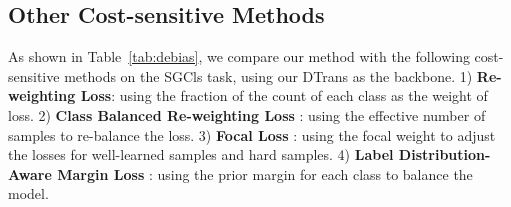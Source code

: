 \subsection{Other Cost-sensitive Methods}
As shown in Table~\ref{tab:debias}, we compare our method with the following cost-sensitive methods on the SGCls task, using our DTrans as the backbone. 
1) \textbf{Re-weighting Loss}: using the fraction of the count of each class as the weight of loss. 
2) \textbf{Class Balanced Re-weighting Loss} \cite{cui2019class}: using the effective number of samples to re-balance the loss. 
3) \textbf{Focal Loss} \cite{Lin_2017_ICCV}: using the focal weight to adjust the losses for well-learned samples and hard samples. 
4) \textbf{Label Distribution-Aware Margin Loss} \cite{cao2019learning}: using the prior margin for each class to balance the model. 



